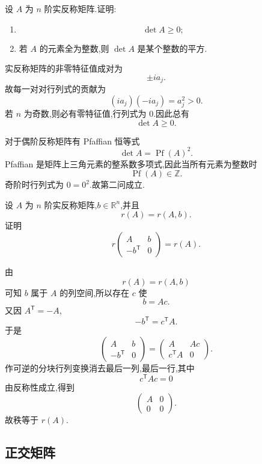 \begin{example}
设 $A$ 为 $n$ 阶实反称矩阵.证明:
\begin{enumerate}
    \item
    \[
    \det A\ge0;
    \]
    \item 若 $A$ 的元素全为整数,则 $\det A$ 是某个整数的平方.
\end{enumerate}
\end{example}
\exampleblank

\begin{solution}
实反称矩阵的非零特征值成对为
\[
\pm ia_j.
\]
故每一对对行列式的贡献为
\[
(ia_j)(-ia_j)=a_j^2>0.
\]
若 $n$ 为奇数,则必有零特征值,行列式为 $0$.因此总有
\[
\boxed{\det A\ge0}.
\]

对于偶阶反称矩阵有 Pfaffian 恒等式
\[
\det A=\operatorname{Pf}(A)^2.
\]
Pfaffian 是矩阵上三角元素的整系数多项式,因此当所有元素为整数时
\[
\operatorname{Pf}(A)\in\mathbb{Z}.
\]
奇阶时行列式为 $0=0^2$.故第二问成立.
\end{solution}


\begin{example}
设 $A$ 为 $n$ 阶实反称矩阵,$b\in\mathbb{R}^n$,并且
\[
r(A)=r(A,b).
\]
证明
\[
r
\begin{pmatrix}
A&b\\
-b^{\mathsf T}&0
\end{pmatrix}
=r(A).
\]
\end{example}
\exampleblank

\begin{solution}
由
\[
r(A)=r(A,b)
\]
可知 $b$ 属于 $A$ 的列空间,所以存在 $c$ 使
\[
b=Ac.
\]
又因 $A^{\mathsf T}=-A$,
\[
-b^{\mathsf T}=c^{\mathsf T}A.
\]
于是
\[
\begin{pmatrix}
A&b\\
-b^{\mathsf T}&0
\end{pmatrix}
=
\begin{pmatrix}
A&Ac\\
c^{\mathsf T}A&0
\end{pmatrix}.
\]
作可逆的分块行列变换消去最后一列,最后一行,其中
\[
c^{\mathsf T}Ac=0
\]
由反称性成立,得到
\[
\begin{pmatrix}
A&0\\
0&0
\end{pmatrix}.
\]
故秩等于 $r(A)$.
\end{solution}


\subsection{正交矩阵}

